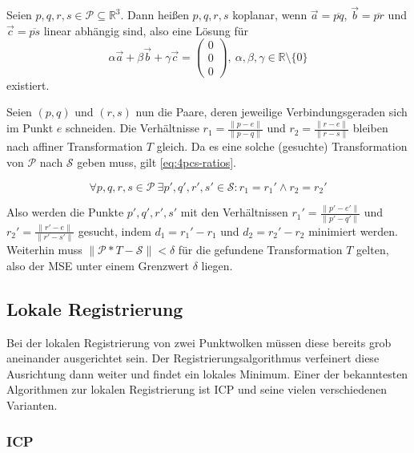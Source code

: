 \begin{definition}
\label{def:koplanar}
Seien $p, q, r, s \in \mathcal{P} \subseteq \mathbb{R}^3$. Dann heißen $p,q,r,s$ koplanar, wenn $\overrightarrow{a} = \overline{pq}$, $\overrightarrow{b} = \overline{pr}$ und $\overrightarrow{c} = \overline{ps}$ linear abhängig sind, also eine Lösung für
$$
\alpha \overrightarrow{a} + \beta \overrightarrow{b} + \gamma \overrightarrow{c} = \begin{pmatrix}0\\0\\0\end{pmatrix},\ \alpha,\beta,\gamma \in \mathbb{R} \setminus \{0\}
$$
existiert.
\end{definition}

Seien $(p, q)$ und $(r, s)$ nun die Paare, deren jeweilige Verbindungsgeraden sich im Punkt $e$ schneiden.
Die Verhältnisse $r_1 = \frac{\|p - e\|}{\|p - q\|}$ und $r_2 = \frac{\|r - e\|}{\|r - s\|}$ bleiben nach affiner Transformation $T$ gleich.
Da es eine solche (gesuchte) Transformation von $\mathcal{P}$ nach $\mathcal{S}$ geben muss, gilt \autoref{eq:4pcs-ratios}.

\begin{equation}
\label{eq:4pcs-ratios}
\forall p,q,r,s \in \mathcal{P}\ \exists p',q',r',s' \in \mathcal{S} : r_1 = r_1' \wedge r_2 = r_2'
\end{equation}

Also werden die Punkte $p',q',r',s'$ mit den Verhältnissen $r_1' = \frac{\|p' - e'\|}{\|p' - q'\|}$ und $r_2' = \frac{\|r' - e\|}{\|r' - s'\|}$ gesucht, indem $d_1 = r_1' - r_1$ und $d_2 = r_2' - r_2$ minimiert werden.
Weiterhin muss $\|\mathcal{P} * T - \mathcal{S}\| < \delta$ für die gefundene Transformation $T$ gelten, also der \ac{MSE} unter einem Grenzwert $\delta$ liegen.


\subsection{Lokale Registrierung}
\label{subsec:local-registration}

Bei der lokalen Registrierung von zwei Punktwolken müssen diese bereits grob aneinander ausgerichtet sein.
Der Registrierungsalgorithmus verfeinert diese Ausrichtung dann weiter und findet ein lokales Minimum.
Einer der bekanntesten Algorithmen zur lokalen Registrierung ist \ac{ICP} und seine vielen verschiedenen Varianten.

\subsubsection{\acl{ICP}}
\label{subsubsec:icp}

